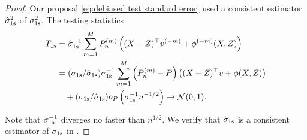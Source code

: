 \documentclass[11pt]{article}
\begin{document}
\begin{proof}
Our proposal \eqref{eq:debiased test standard error} used a consistent estimator $\hat \sigma_{\rm 1s}^2$ of $\sigma_{\rm 1s}^2$. The testing statistics
\begin{align*}
   T_{\rm 1s} 
        & = \hat \sigma_{\rm 1s}^{-1}\sum_{m=1}^M P_n^{(m)}\left((X-Z)^{\top} v^{(-m)}+\phi^{(-m)}(X, Z)\right)\\
        & = (\sigma_{\rm 1s}/\hat \sigma_{\rm 1s})\sigma_{\rm 1s}^{-1}\sum_{m=1}^M\left(P_n^{(m)}-P\right)\left((X-Z)^{\top} v +\phi(X, Z)\right)\\
        & \quad +(\sigma_{\rm 1s}/\hat \sigma_{\rm 1s})o_P\left(\sigma_{\rm 1s}^{-1}n^{-1 / 2}\right)
        \rightarrow \mathcal{N}(0,1). 
\end{align*}

Note that $\sigma_{\rm 1s}^{-1}$ diverges no faster than $n^{1/2}$. We verify that $\hat \sigma_{\rm 1s}$ is a consistent estimator of $\sigma_{\rm 1s}$ in . 
\end{proof}
\end{document}
